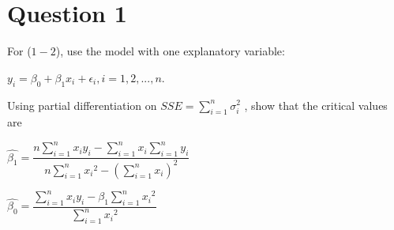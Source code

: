 \section{Question 1}

\begin{question}
    For ($1-2$), use the model with one explanatory variable:
    \begin{center}
        $y_i = \beta_0 + \beta_1x_i + \epsilon_i, i = 1,2,...,n$.
    \end{center}

    Using partial differentiation on $SSE= \sum_{i = 1}^{n}{\sigma_{i}^2}$ , show that the critical values are
    \begin{center}
        $\hat{\beta_1} = \dfrac{n\sum_{i=1}^{n}{x_{i}y_{i}} - \sum_{i =1}^{n}{x_i}\sum_{i = 1}^{n}{y_i}}{n \sum_{i = 1}^{n}{x_i}^2 - \left(\sum_{i = 1}^{n}{x_i}\right)^2}$
        
        $\hat{\beta_0} = \dfrac{\sum_{i=1}^{n}{x_{i}y_{i}} - \beta_1\sum_{i =1}^{n}{{x_i}^2}}{\sum_{i = 1}^{n}{x_i}^2}$
    \end{center}
\end{question}


